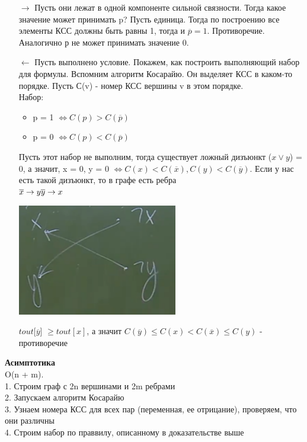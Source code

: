  \begin{itemize}
     \item [$\rightarrow$] Пусть они лежат в одной компоненте сильной связности. Тогда какое значение может принимать p? Пусть единица. Тогда по построению все элементы КСС должны быть равны 1, тогда и $\overline{p} = 1$.  Противоречие. Аналогично р не может принимать значение 0.
     \item [$\leftarrow$] Пусть выполнено условие. Покажем, как построить выполняющий набор для формулы. Вспомним алгоритм Косарайю. Он выделяет КСС в каком-то порядке. Пусть С(v) - номер КСС вершины v в этом порядке. \\ Набор:
     \begin{itemize}
         \item p = 1 $\Longleftrightarrow C(p) > C(\overline{p})$
         \item p = 0 $\Longleftrightarrow C(p) < C(\overline{p})$
     \end{itemize}
     Пусть этот набор не выполним, тогда существует ложный дизъюнкт ($x \vee y$) = 0, а значит,  x = 0, y = 0  $\Longleftrightarrow C(x) < C(\overline{x}),C(y) < C(\overline{y}) $. Если у нас есть такой дизъюнкт, то в графе есть ребра \\ $\overline{x} \rightarrow y \\ \overline{y} \rightarrow x $
     \begin{center}
         \includegraphics[width=7cm]{images/33_alg16.PNG}
     \end{center}
     $tout[\overline{y}$] $\geq  tout[x]$, а значит $C(\overline{y}) \leq C(x) < C(\overline{x}) \leq C(y) $ - противоречие
 \end{itemize}
 \textbf{Асимптотика} \\
 O(n + m).
 \\
 1. Строим граф с 2n вершинами и 2m ребрами
\\
2. Запускаем алгоритм Косарайю\\
3. Узнаем номера КСС для всех пар (переменная, ее отрицание), проверяем, что они различны\\
4. Строим набор по праввилу, описанному в доказательстве выше